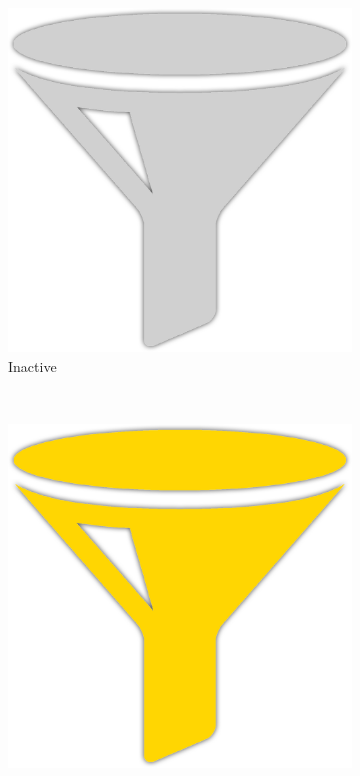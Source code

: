 \begin{figure}[H]
\centering
\begin{subfigure}[b]{\figureScale\textwidth}
\centering
\includegraphics[scale=\innerScale]{Figures/greyPlain}
\caption{Inactive}
\label{fig:chromeInactive}
\end{subfigure}~
\begin{subfigure}[b]{\figureScale\textwidth}
\centering
\includegraphics[scale=\innerScale]{Figures/yellowPlain}

\end{subfigure}
\end{figure}
